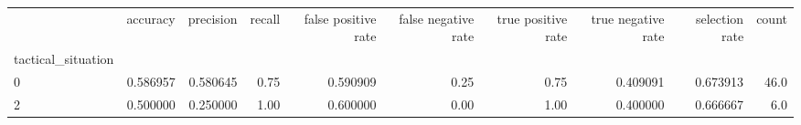 \begin{tabular}{lrrrrrrrrr}
\toprule
{} &  accuracy &  precision &  recall &  false positive rate &  false negative rate &  true positive rate &  true negative rate &  selection rate &  count \\
tactical\_situation &           &            &         &                      &                      &                     &                     &                 &        \\
\midrule
0                  &  0.586957 &   0.580645 &    0.75 &             0.590909 &                 0.25 &                0.75 &            0.409091 &        0.673913 &   46.0 \\
2                  &  0.500000 &   0.250000 &    1.00 &             0.600000 &                 0.00 &                1.00 &            0.400000 &        0.666667 &    6.0 \\
\bottomrule
\end{tabular}
